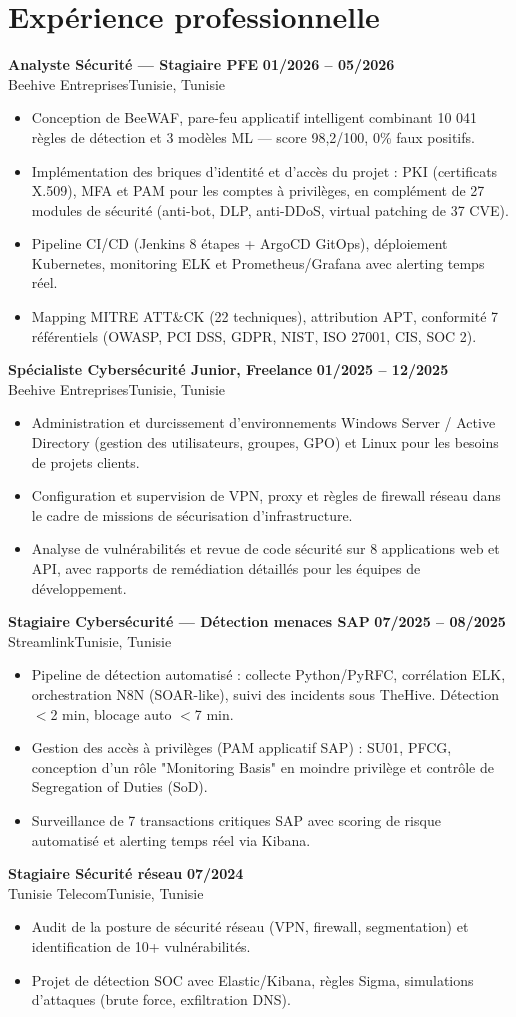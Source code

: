 \documentclass[a4paper,9pt]{article}
\newcommand{\cventry}[4]{\textbf{#1} \hfill \textbf{#4}\\[0.2pt]#2{\ifx\relax#3\relax\else, #3\fi}\par\vspace{0.3pt}}
\begin{document}
\section{Expérience professionnelle}
\cventry{Analyste Sécurité --- Stagiaire PFE}{Beehive Entreprises}{Tunisie}{01/2026 -- 05/2026}
\begin{itemize}
  \item Conception de BeeWAF, pare-feu applicatif intelligent combinant 10 041 règles de détection et 3 modèles ML --- score 98,2/100, 0\% faux positifs.
  \item Implémentation des briques d'identité et d'accès du projet : PKI (certificats X.509), MFA et PAM pour les comptes à privilèges, en complément de 27 modules de sécurité (anti-bot, DLP, anti-DDoS, virtual patching de 37 CVE).
  \item Pipeline CI/CD (Jenkins 8 étapes + ArgoCD GitOps), déploiement Kubernetes, monitoring ELK et Prometheus/Grafana avec alerting temps réel.
  \item Mapping MITRE ATT\&CK (22 techniques), attribution APT, conformité 7 référentiels (OWASP, PCI DSS, GDPR, NIST, ISO 27001, CIS, SOC 2).
\end{itemize}
\cventry{Spécialiste Cybersécurité Junior, Freelance}{Beehive Entreprises}{Tunisie}{01/2025 -- 12/2025}
\begin{itemize}
  \item Administration et durcissement d'environnements Windows Server / Active Directory (gestion des utilisateurs, groupes, GPO) et Linux pour les besoins de projets clients.
  \item Configuration et supervision de VPN, proxy et règles de firewall réseau dans le cadre de missions de sécurisation d'infrastructure.
  \item Analyse de vulnérabilités et revue de code sécurité sur 8 applications web et API, avec rapports de remédiation détaillés pour les équipes de développement.
\end{itemize}
\cventry{Stagiaire Cybersécurité --- Détection menaces SAP}{Streamlink}{Tunisie}{07/2025 -- 08/2025}
\begin{itemize}
  \item Pipeline de détection automatisé : collecte Python/PyRFC, corrélation ELK, orchestration N8N (SOAR-like), suivi des incidents sous TheHive. Détection $<$2 min, blocage auto $<$7 min.
  \item Gestion des accès à privilèges (PAM applicatif SAP) : SU01, PFCG, conception d'un rôle "Monitoring Basis" en moindre privilège et contrôle de Segregation of Duties (SoD).
  \item Surveillance de 7 transactions critiques SAP avec scoring de risque automatisé et alerting temps réel via Kibana.
\end{itemize}
\cventry{Stagiaire Sécurité réseau}{Tunisie Telecom}{Tunisie}{07/2024}
\begin{itemize}
  \item Audit de la posture de sécurité réseau (VPN, firewall, segmentation) et identification de 10+ vulnérabilités.
  \item Projet de détection SOC avec Elastic/Kibana, règles Sigma, simulations d'attaques (brute force, exfiltration DNS).
\end{itemize}
\end{document}
